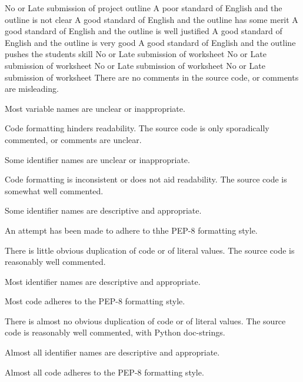 \documentclass{../fal_assignment}
\begin{document}
\rubricyeartwo
\begin{markingrubric}
		\grade\fail No or Late submission of project outline
	\grade A poor standard of English and the outline is not clear
	\grade A good standard of English and the outline has some merit
	\grade A good standard of English and the outline is well justified
	\grade A good standard of English and the outline is very good
	\grade A good standard of English and the outline pushes the students skill
		\grade\fail No or Late submission of worksheet
		\grade\fail No or Late submission of worksheet
		\grade\fail No or Late submission of worksheet
		\grade\fail No or Late submission of worksheet
\grade\fail There are no comments in the source code, or comments are misleading.
\par Most variable names are unclear or inappropriate.
\par Code formatting hinders readability.
\grade The source code is only sporadically commented, or comments are unclear.
\par Some identifier names are unclear or inappropriate.
\par Code formatting is inconsistent or does not aid readability.
\grade The source code is somewhat well commented.
\par Some identifier names are descriptive and appropriate.
\par An attempt has been made to adhere to thhe PEP-8 formatting style.
\par There is little obvious duplication of code or of literal values.           
\grade The source code is reasonably well commented.
\par Most identifier names are descriptive and appropriate.
\par Most code adheres to the PEP-8 formatting style.
\par There is almost no obvious duplication of code or of literal values.   
\grade The source code is reasonably well commented, with Python doc-strings.
\par Almost all identifier names are descriptive and appropriate.
\par Almost all code adheres to the PEP-8 formatting style.

\end{markingrubric}
\end{document}
